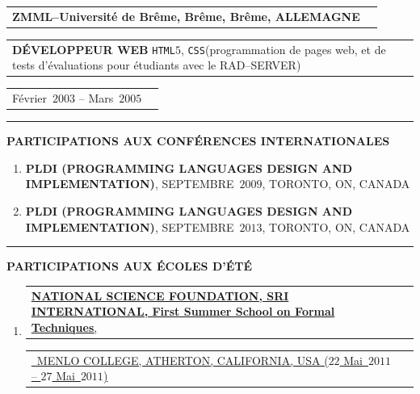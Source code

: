 \documentclass[9pt,a4paper]{article} %
\makeatletter
\newcommand{\headerrow}[2]
{\begin{tabular*}{\linewidth}{l@{\extracolsep{\fill}}r}
	#1 &
	#2 \\
\end{tabular*}}
\newcommand{\headerrowONE}[1]{\headerrow{#1}{}}
\newcommand{\css}{\texttt{CSS}\xspace}
\newcommand{\html}{\texttt{HTML$5$}\xspace}
\newcommand{\cvitemdate}[2]{#1~$#2$\xspace}
\newcommand{\cvitempositionheld}[1]{\textbf{#1}\xspace}
\makeatother
\begin{document}
\vspace{0.3em}

\headerrowONE{\textbf{ZMML--Université de Brême, Brême, Brême, ALLEMAGNE}}	
\headerrowONE{\cvitempositionheld{DÉVELOPPEUR WEB} \html, \css (programmation de pages web,
et de tests d'évaluations pour étudiants avec le RAD--SERVER)}
\headerrowONE{\cvitemdate{Février}{2003} -- \cvitemdate{Mars}{2005}}	

\vspace{1em}


\hrule
\begin{center}
{\large \textbf{PARTICIPATIONS AUX CONFÉRENCES INTERNATIONALES}}
\end{center}

\vspace{0.5em}

\begin{enumerate}
	\item \textbf{PLDI (PROGRAMMING LANGUAGES DESIGN AND IMPLEMENTATION)},
		\cvitemdate{SEPTEMBRE}{2009}, TORONTO, ON, CANADA

	\item \textbf{PLDI (PROGRAMMING LANGUAGES DESIGN AND IMPLEMENTATION)},
		\cvitemdate{SEPTEMBRE}{2013}, TORONTO, ON, CANADA

\end{enumerate}

\vspace{1em}


\hrule
\begin{center}
{\large \textbf{PARTICIPATIONS AUX ÉCOLES D'ÉTÉ}}
\end{center}

\vspace{0.5em}

\begin{enumerate}
	\item \headerrowONE{\href{http://fm.csl.sri.com/SSFT11/}{\textbf{NATIONAL SCIENCE FOUNDATION, SRI INTERNATIONAL, First Summer School on Formal Techniques},}}
			\headerrowONE{\href{http://fm.csl.sri.com/SSFT11}{\ \hfill  MENLO COLLEGE, ATHERTON, 
			CALIFORNIA, USA (\cvitemdate{$22$ Mai}{2011} -- \cvitemdate{$27$ Mai}{2011})}}

\end{enumerate}

\vspace{1em}
\end{document}
